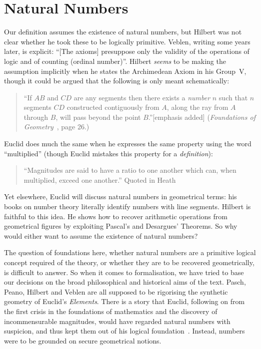 \section{Natural Numbers}
Our definition assumes the existence of natural numbers, but Hilbert was not clear whether he took these to be logically primitive. Veblen, writing some years later, is explicit: ``[The axioms] presuppose only the validity of the operations of logic and of counting (ordinal number)''. Hilbert \emph{seems} to be making the assumption implicitly when he states the Archimedean Axiom in his Group~V, though it could be argued that the following is only meant schematically:
\begin{quote}
  ``If $AB$ and $CD$ are any segments then there exists a \emph{number} $n$ such that $n$ segments $CD$ constructed contiguously from $A$, along the ray from $A$ through $B$, will pass beyond the point $B$.''[emphasis added] (\emph{Foundations of Geometry}~\cite{FoundationsOfGeometry}, page 26.)
\end{quote}

Euclid does much the same when he expresses the same property using the word ``multiplied'' (though Euclid mistakes this property for a \emph{definition}):
\begin{quote}
  ``Magnitudes are said to have a ratio to one another which can, when multiplied, exceed one another.'' Quoted in Heath~\cite{HeathElements}
\end{quote}

Yet elsewhere, Euclid will discuss natural numbers in geometrical terms: his books on number theory literally identify numbers with line segments. Hilbert is faithful to this idea. He shows how to recover arithmetic operations from geometrical figures by exploiting Pascal's and Desargues' Theorems. So why would either want to assume the existence of natural numbers?

The question of foundations here, whether natural numbers are a primitive logical concept required of the theory, or whether they are to be recovered geometrically, is difficult to answer. So when it comes to formalisation, we have tried to base our decisions on the broad philosophical and historical aims of the text. Pasch, Peano, Hilbert and Veblen are all supposed to be rigorising the synthetic geometry of Euclid's \emph{Elements}. There is a story that Euclid, following on from the first crisis in the foundations of mathematics and the discovery of incommensurable magnitudes, would have regarded natural numbers with suspicion, and thus kept them out of his logical foundation~\cite{EvolutionEuclideanElements}. Instead, numbers were to be grounded on secure geometrical notions.

